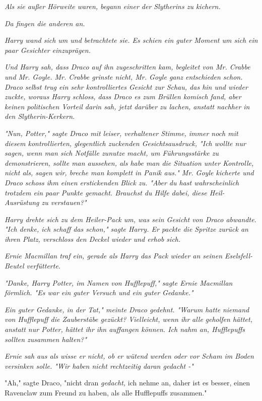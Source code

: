 {\emph{Als sie außer Hörweite waren, begann einer der Slytherins zu kichern.}

\emph{Da fingen die anderen an.}

\emph{Harry wand sich um und betrachtete sie. Es schien ein guter Moment um sich ein paar Gesichter einzuprägen.}

\emph{Und Harry sah, dass Draco auf ihn zugeschritten kam, begleitet von Mr. Crabbe und Mr. Goyle. Mr. Crabbe grinste nicht, Mr. Goyle ganz entschieden schon. Draco selbst trug ein sehr kontrolliertes Gesicht zur Schau, das hin und wieder zuckte, woraus Harry schloss, dass Draco es zum Brüllen komisch fand, aber keinen politischen Vorteil darin sah, jetzt darüber zu lachen, anstatt nachher in den Slytherin-Kerkern.}

\emph{"Nun, Potter," sagte Draco mit leiser, verhaltener Stimme, immer noch mit diesem kontrollierten, glegentlich zuckenden Gesichtsausdruck, "Ich wollte nur sagen, wenn man sich Notfälle zunutze macht, um Führungsstärke zu demonstrieren, sollte man aussehen, als habe man die Situation unter Kontrolle, nicht als, sagen wir, breche man komplett in Panik aus." Mr. Goyle kicherte und Draco schoss ihm einen erstickenden Blick zu. "Aber du hast wahrscheinlich trotzdem ein paar Punkte gemacht. Brauchst du Hilfe dabei, diese Heil-Ausrüstung zu verstauen?"}

\emph{Harry drehte sich zu dem Heiler-Pack um, was sein Gesicht von Draco abwandte. "Ich denke, ich schaff das schon," sagte Harry. Er packte die Spritze zurück an ihren Platz, verschloss den Deckel wieder und erhob sich.}

\emph{Ernie Macmillan traf ein, gerade als Harry das Pack wieder an seinen Eselsfell-Beutel verfütterte.}

\emph{"Danke, Harry Potter, im Namen von Hufflepuff," sagte Ernie Macmillan förmlich. "Es war ein guter Versuch und ein guter Gedanke."}

\emph{Ein guter Gedanke, in der Tat," meinte Draco gedehnt. "Warum hatte} \emph{niemand von Hufflepuff die Zauberstäbe gezückt? Vielleicht, wenn ihr} \emph{\emph{alle}} \emph{geholfen hättet, anstatt nur Potter, hättet ihr ihn auffangen können. Ich nahm an, Hufflepuffs sollten zusammen halten?"}

\emph{Ernie sah aus als wisse er nicht, ob er wütend werden oder vor Scham im Boden versinken solle. "Wir haben nicht rechtzeitig daran gedacht -"}

"Ah," sagte Draco, "nicht dran \emph{gedacht,} ich nehme an, daher ist es besser, einen Ravenclaw zum Freund zu haben, als alle Hufflepuffs zusammen."

}
